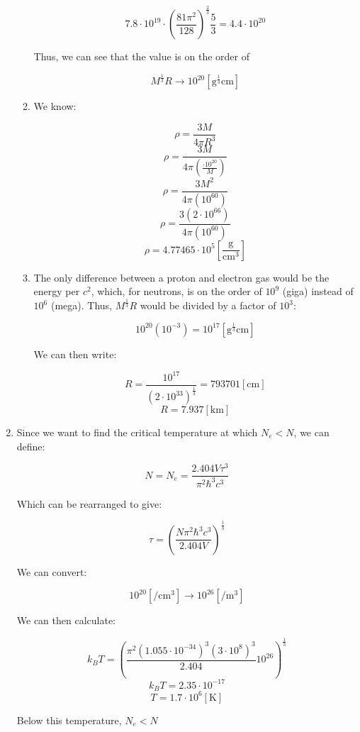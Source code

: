 \begin{enumerate}
\begin{enumerate}
        $$7.8\cdot10^{19}\cdot\left( \frac{81\pi^2}{128} \right)^{\frac{2}{3}}\frac{5}{3}=4.4\cdot10^{20}$$

        Thus, we can see that the value is on the order of

        $$\boxed{M^{\frac{1}{3}}R\to 10^{20}[\si{\gram^{\frac{1}{3}}\centi\meter}]}$$

      \item 

        We know:

        $$\rho=\frac{3M}{4\pi R^3}$$
        $$\rho=\frac{3M}{4\pi \left( \frac{\cdot10^{20}}{M} \right)}$$
        $$\rho=\frac{3M^2}{4\pi \left( 10^{60} \right)}$$
        $$\rho=\frac{3(2\cdot10^{66})}{4\pi \left( 10^{60} \right)}$$
        $$\boxed{\rho=4.77465\cdot10^5\left[ \frac{\si{\gram}}{\si{\centi\meter\cubed}} \right]}$$

      \item 

        The only difference between a proton and electron gas would be the energy per $c^2$, which, for neutrons, is on the order of $10^9$ (giga) instead of $10^6$ (mega). Thus, $M^{\frac{1}{3}}R$ would be divided by a factor of $10^3$:

        $$10^{20}(10^{-3})=10^{17}[\si{\gram^{\frac{1}{3}}\centi\meter}]$$

        We can then write:

        $$R=\frac{10^{17}}{(2\cdot10^{33})^{\frac{1}{3}}}=793701[\si{\centi\meter}]$$
        $$\boxed{R=7.937[\si{\kilo\meter}]}$$

    \end{enumerate}

  \item

    Since we want to find the critical temperature at which $N_e<N$, we can define:

    $$N=N_e=\frac{2.404V\tau^3}{\pi^2\hbar^3c^3}$$

    Which can be rearranged to give:

    $$\tau=\left( \frac{N\pi^2\hbar^3c^3}{2.404V} \right)^{\frac{1}{3}}$$

    We can convert:

    $$10^{20}[\si{\per\centi\meter\cubed}]\to10^{26}[\si{\per\meter\cubed}]$$

    We can then calculate:

    $$k_BT=\left( \frac{\pi^2(1.055\cdot10^{-34})^3(3\cdot10^8)^3}{2.404}10^{26} \right)^{\frac{1}{3}}$$
    $$k_BT=2.35\cdot10^{-17}$$
    $$\boxed{T=1.7\cdot10^6[\si{\kelvin}]}$$

    Below this temperature, $N_e<N$

\end{enumerate}



